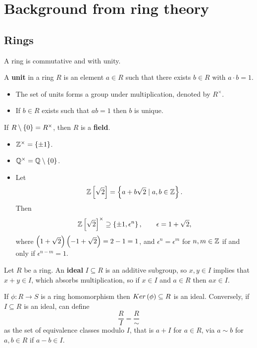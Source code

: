 \pagebreak

\section{Background from ring theory}


\subsection{Rings}

A ring is commutative and with unity.

\begin{definition}
A \textbf{unit} in a ring $ R $ is an element $ a \in R $ such that there exists $ b \in R $ with $ a \cdot b = 1 $.
\begin{itemize}
\item The set of units forms a group under multiplication, denoted by $ R^\times $.
\item If $ b \in R $ exists such that $ ab = 1 $ then $ b $ is unique.
\end{itemize}
If $ R \setminus \cbr{0} = R^\times $, then $ R $ is a \textbf{field}.
\end{definition}

\begin{example*}
\hfill
\begin{itemize}
\item $ \Z^\times = \cbr{\pm 1} $.
\item $ \Q^\times = \Q \setminus \cbr{0} $.
\item Let
$$ \Z\sbr{\sqrt{2}} = \cbr{a + b\sqrt{2} \mid a, b \in \Z}. $$
Then
$$ \Z\sbr{\sqrt{2}}^\times \supseteq \cbr{\pm 1, \epsilon^n}, \qquad \epsilon = 1 + \sqrt{2}, $$
where $ \br{1 + \sqrt{2}}\br{-1 + \sqrt{2}} = 2 - 1 = 1 $, and $ \epsilon^n = \epsilon^m $ for $ n, m \in \mathbb{Z} $ if and only if $ \epsilon^{n - m} = 1 $.
\end{itemize}
\end{example*}

\begin{definition}
Let $ R $ be a ring. An \textbf{ideal} $ I \subseteq R $ is an additive subgroup, so $ x, y \in I $ implies that $ x + y \in I $, which absorbs multiplication, so if $ x \in I $ and $ a \in R $ then $ ax \in I $.
\end{definition}

\begin{fact*}
If $ \phi : R \to S $ is a ring homomorphism then $ Ker\br{\phi} \subseteq R $ is an ideal. Conversely, if $ I \subseteq R $ is an ideal, can define
$$ \dfrac{R}{I} = \dfrac{R}{\sim} $$
as the set of equivalence classes modulo $ I $, that is $ a + I $ for $ a \in R $, via $ a \sim b $ for $ a, b \in R $ if $ a - b \in I $.
\end{fact*}

